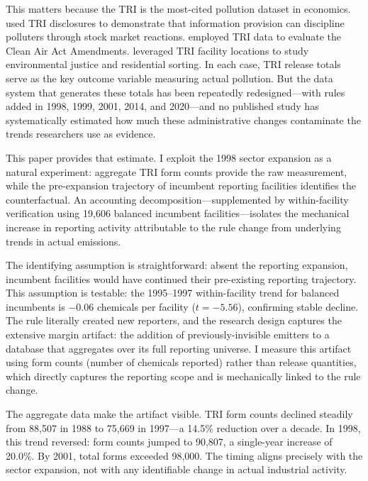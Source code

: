 \documentclass[12pt]{article}
\begin{document}
This matters because the TRI is the most-cited pollution dataset in economics. \citet{hamilton1995pollution} used TRI disclosures to demonstrate that information provision can discipline polluters through stock market reactions. \citet{greenstone2004did} employed TRI data to evaluate the Clean Air Act Amendments. \citet{banzhaf2008environmental} leveraged TRI facility locations to study environmental justice and residential sorting. In each case, TRI release totals serve as the key outcome variable measuring actual pollution. But the data system that generates these totals has been repeatedly redesigned---with rules added in 1998, 1999, 2001, 2014, and 2020---and no published study has systematically estimated how much these administrative changes contaminate the trends researchers use as evidence.

This paper provides that estimate. I exploit the 1998 sector expansion as a natural experiment: aggregate TRI form counts provide the raw measurement, while the pre-expansion trajectory of incumbent reporting facilities identifies the counterfactual. An accounting decomposition---supplemented by within-facility verification using 19,606 balanced incumbent facilities---isolates the mechanical increase in reporting activity attributable to the rule change from underlying trends in actual emissions.

The identifying assumption is straightforward: absent the reporting expansion, incumbent facilities would have continued their pre-existing reporting trajectory. This assumption is testable: the 1995--1997 within-facility trend for balanced incumbents is $-0.06$ chemicals per facility ($t = -5.56$), confirming stable decline. The rule literally created new reporters, and the research design captures the extensive margin artifact: the addition of previously-invisible emitters to a database that aggregates over its full reporting universe. I measure this artifact using form counts (number of chemicals reported) rather than release quantities, which directly captures the reporting scope and is mechanically linked to the rule change.

The aggregate data make the artifact visible. TRI form counts declined steadily from 88,507 in 1988 to 75,669 in 1997---a 14.5\% reduction over a decade. In 1998, this trend reversed: form counts jumped to 90,807, a single-year increase of 20.0\%. By 2001, total forms exceeded 98,000. The timing aligns precisely with the sector expansion, not with any identifiable change in actual industrial activity.
\end{document}
